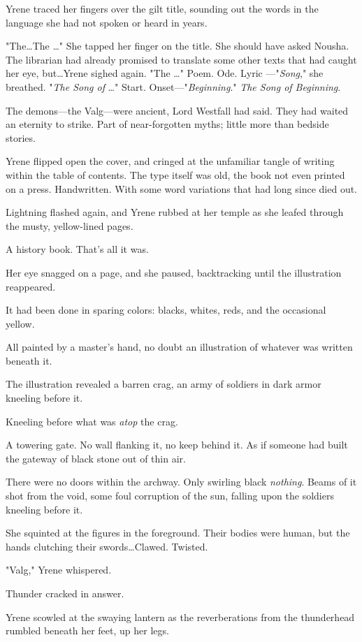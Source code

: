Yrene traced her fingers over the gilt title, sounding out the words in the language she had not spoken or heard in years.

"The\ldots The \ldots" She tapped her finger on the title.
She should have asked Nousha.
The librarian had already promised to translate some other texts that had caught her eye, but\ldots Yrene sighed again.
"The \ldots" Poem.
Ode.
Lyric ---"\emph{Song}," she breathed.
"\emph{The Song of} \ldots" Start.
Onset---"\emph{Beginning}."
\emph{The Song of Beginning}.

The demons---the Valg---were ancient, Lord Westfall had said.
They had waited an eternity to strike.
Part of near-forgotten myths; little more than bedside stories.

Yrene flipped open the cover, and cringed at the unfamiliar tangle of writing within the table of contents.
The type itself was old, the book not even printed on a press.
Handwritten.
With some word variations that had long since died out.

Lightning flashed again, and Yrene rubbed at her temple as she leafed through the musty, yellow-lined pages.

A history book.
That's all it was.

Her eye snagged on a page, and she paused, backtracking until the illustration reappeared.

It had been done in sparing colors: blacks, whites, reds, and the occasional yellow.

All painted by a master's hand, no doubt an illustration of whatever was written beneath it.

The illustration revealed a barren crag, an army of soldiers in dark armor kneeling before it.

Kneeling before what was \emph{atop} the crag.

A towering gate.
No wall flanking it, no keep behind it.
As if someone had built the gateway of black stone out of thin air.

There were no doors within the archway.
Only swirling black \emph{nothing}.
Beams of it shot from the void, some foul corruption of the sun, falling upon the soldiers kneeling before it.

She squinted at the figures in the foreground.
Their bodies were human, but the hands clutching their swords\ldots Clawed.
Twisted.

"Valg," Yrene whispered.

Thunder cracked in answer.

Yrene scowled at the swaying lantern as the reverberations from the thunderhead rumbled beneath her feet, up her legs.

